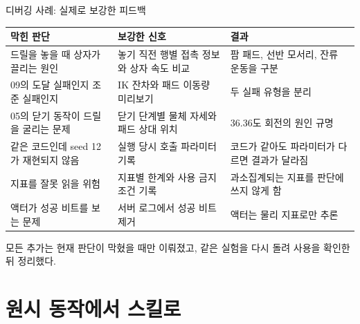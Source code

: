 \documentclass[aspectratio=169,10pt]{beamer}
\begin{document}
\begin{frame}{디버깅 사례: 실제로 보강한 피드백}
  \scriptsize
  \begin{tabular}{@{}p{}p{}p{}@{}}
    \toprule
    막힌 판단 & 보강한 신호 & 결과 \\
    \midrule
    드릴을 놓을 때 상자가 끌리는 원인 & 놓기 직전 행별 접촉 정보와 상자 속도 비교 & 팜 패드, 선반 모서리, 잔류 운동을 구분 \\
    09의 도달 실패인지 조준 실패인지 & IK 잔차와 패드 이동량 미리보기 & 두 실패 유형을 분리 \\
    05의 닫기 동작이 드릴을 굴리는 문제 & 닫기 단계별 물체 자세와 패드 상대 위치 & 36.36도 회전의 원인 규명 \\
    같은 코드인데 seed 12가 재현되지 않음 & 실행 당시 호출 파라미터 기록 & 코드가 같아도 파라미터가 다르면 결과가 달라짐 \\
    지표를 잘못 읽을 위험 & 지표별 한계와 사용 금지 조건 기록 & 과소집계되는 지표를 판단에 쓰지 않게 함 \\
    액터가 성공 비트를 보는 문제 & 서버 로그에서 성공 비트 제거 & 액터는 물리 지표로만 추론 \\
    \bottomrule
  \end{tabular}

  \vspace{0.3em}
  \footnotesize
  모든 추가는 현재 판단이 막혔을 때만 이뤄졌고, 같은 실험을 다시 돌려 사용을 확인한 뒤 정리했다.
\end{frame}

\section{원시 동작에서 스킬로}
\end{document}
